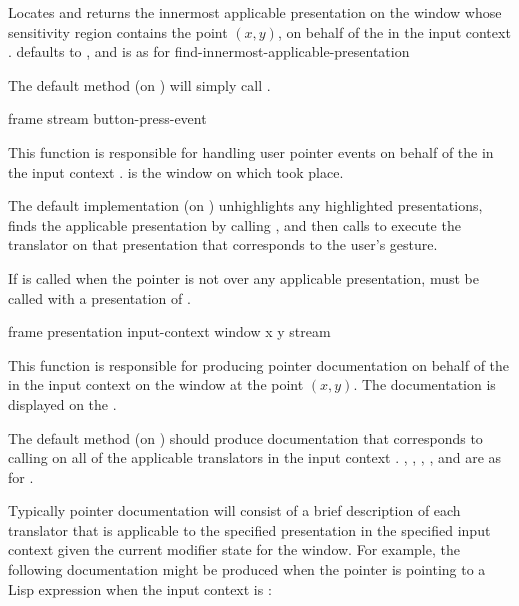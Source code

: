 {Locates and returns the innermost applicable presentation on the window
 whose sensitivity region contains the point $(x,y)$, on behalf of
the   in the input context .
 defaults to , and is as for
{find-innermost-applicable-presentation}

The default method (on ) will simply call
.

 {frame stream button-press-event}

This function is responsible for handling user pointer events on behalf of the
  in the input context .
 is the window on which  took place.

The default implementation (on ) unhighlights any
highlighted presentations, finds the applicable presentation by calling
, and then calls
 to execute the translator on that
presentation that corresponds to the user's gesture.

If  is called when the pointer is
not over any applicable presentation,  must
be called with a presentation of .


 {frame presentation input-context window x y stream}

This function is responsible for producing pointer documentation on behalf of
the   in the input context  on the
window  at the point $(x,y)$.  The documentation is displayed on the
 .

The default method (on ) should produce
documentation that corresponds to calling 
on all of the applicable translators in the input context .
, , , , and  are as for
.

Typically pointer documentation will consist of a brief description of each
translator that is applicable to the specified presentation in the specified
input context given the current modifier state for the window.  For example, the
following documentation might be produced when the pointer is pointing to a Lisp
expression when the input context is :

}
